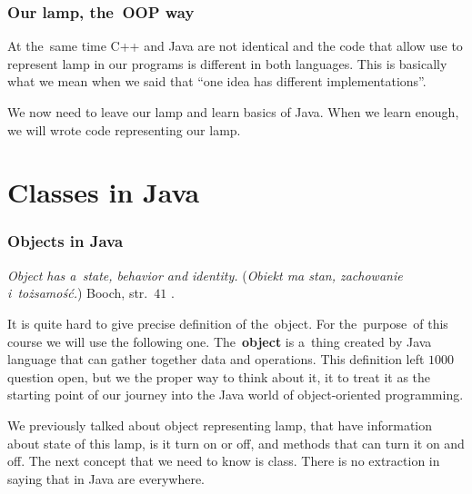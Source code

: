 \documentclass[10pt,t]{beamer}
\begin{document}
\begin{frame}
  \frametitle{Our lamp, the~OOP way}


  At the~same time C++ and Java are not identical and the code that
  allow use to represent lamp in our programs is different in both
  languages. This is basically what we mean when we said that ``one idea
  has different implementations''.

  We now need to leave our lamp and learn basics of Java. When we learn
  enough, we will wrote code representing our lamp.

\end{frame}










\section{Classes in Java}


\begin{frame}
  \frametitle{Objects in Java}


  \textit{Object has a~state, behavior and identity.} (\textit{Obiekt ma
    stan, zachowanie i~tożsamość.}) Booch, str.~$41$
  \parencite{Eckel-Thinnking-in-Java-Ed-polska-Wyd-III-Pub-2003}.

  It is quite hard to give precise definition of the~object. For
  the~purpose~of this course we will use the following one.
  The~\textbf{object} is a~thing created by Java language that can gather
  together data and operations. This definition left $1000$ question open,
  but we the proper way to think about it, it to treat it as the starting
  point of our journey into the Java world of object-oriented programming.

  We previously talked about object representing lamp, that have information
  about state of this lamp, is it turn on or off, and methods that can turn
  it on and off. The next concept that we need to know is class. There
  is no extraction in saying that in Java are everywhere.

\end{frame}
\end{document}
